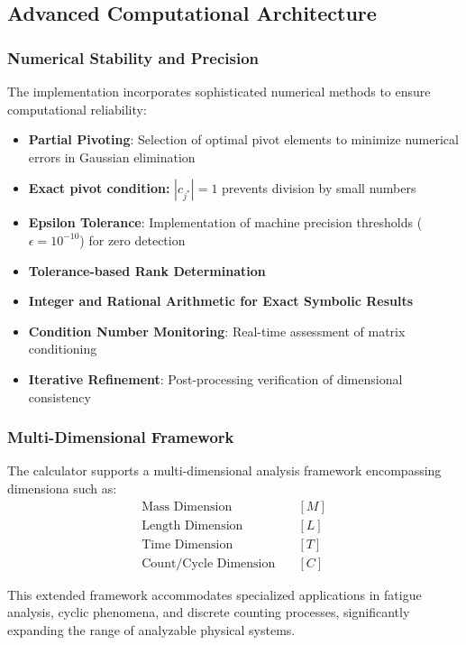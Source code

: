 \documentclass[
	11pt, %
	fleqn, %
	a4paper, %
]{LegrandOrangeBook}
\begin{document}
\subsection{Advanced Computational Architecture}
\subsubsection{Numerical Stability and Precision}
The implementation incorporates sophisticated numerical methods to ensure computational reliability:
\begin{itemize}
    \item \textbf{Partial Pivoting}: Selection of optimal pivot elements to minimize numerical errors in Gaussian elimination
    \item \textbf{Exact pivot condition:} $|c_{j^*}| = 1$ prevents division by small numbers
    \item \textbf{Epsilon Tolerance}: Implementation of machine precision thresholds ($\epsilon = 10^{-10}$) for zero detection
    \item \textbf{Tolerance-based Rank Determination}
    \item \textbf{Integer and Rational Arithmetic for Exact Symbolic Results}
    \item \textbf{Condition Number Monitoring}: Real-time assessment of matrix conditioning
    \item \textbf{Iterative Refinement}: Post-processing verification of dimensional consistency
\end{itemize}

\subsubsection{Multi-Dimensional Framework}
The calculator supports a multi-dimensional analysis framework encompassing dimensiona such as:
\begin{align}
\text{Mass Dimension} &\quad [M] \\
\text{Length Dimension} &\quad [L] \\
\text{Time Dimension} &\quad [T] \\
\text{Count/Cycle Dimension} &\quad [C]
\end{align}

This extended framework accommodates specialized applications in fatigue analysis, cyclic phenomena, and discrete counting processes, significantly expanding the range of analyzable physical systems.
\end{document}
